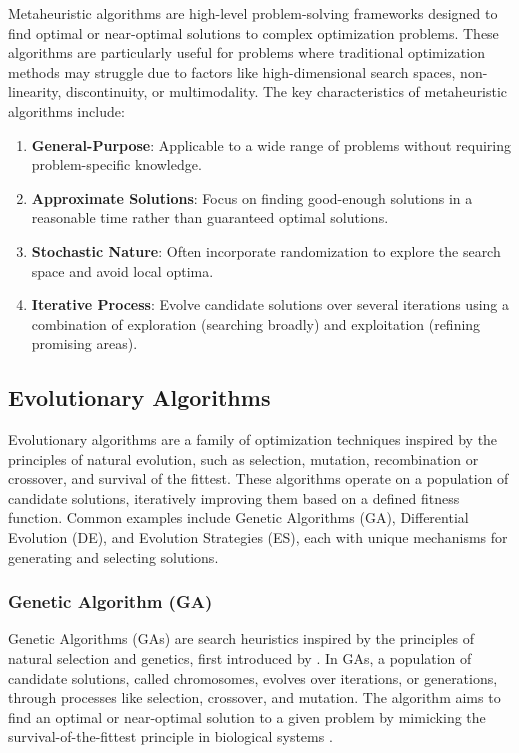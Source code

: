 Metaheuristic algorithms are high-level problem-solving frameworks designed to find optimal or near-optimal solutions to complex optimization problems. These algorithms are particularly useful for problems where traditional optimization methods may struggle due to factors like high-dimensional search spaces, non-linearity, discontinuity, or multimodality. The key characteristics of metaheuristic algorithms include:
\begin{enumerate}
   \item \textbf{General-Purpose}: Applicable to a wide range of problems without requiring problem-specific knowledge.
   \item \textbf{Approximate Solutions}: Focus on finding good-enough solutions in a reasonable time rather than guaranteed optimal solutions.
   \item \textbf{Stochastic Nature}: Often incorporate randomization to explore the search space and avoid local optima.
   \item \textbf{Iterative Process}: Evolve candidate solutions over several iterations using a combination of exploration (searching broadly) and exploitation (refining promising areas).
\end{enumerate}

\subsection{Evolutionary Algorithms}
Evolutionary algorithms are a family of optimization techniques inspired by the principles of natural evolution, such as selection, mutation, recombination or crossover, and survival of the fittest. These algorithms operate on a population of candidate solutions, iteratively improving them based on a defined fitness function. Common examples include Genetic Algorithms (GA), Differential Evolution (DE), and Evolution Strategies (ES), each with unique mechanisms for generating and selecting solutions. 

\subsubsection*{Genetic Algorithm (GA)}

Genetic Algorithms (GAs) are search heuristics inspired by the principles of natural selection and genetics, first introduced by \textcite{holland1975introductory}. In GAs, a population of candidate solutions, called chromosomes, evolves over iterations, or generations, through processes like selection, crossover, and mutation. The algorithm aims to find an optimal or near-optimal solution to a given problem by mimicking the survival-of-the-fittest principle in biological systems \parencite{mitchell1998introduction}.

